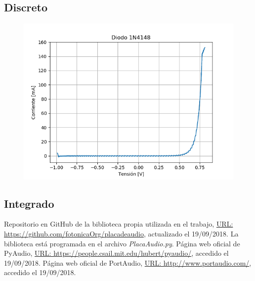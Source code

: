 \documentclass[a4paper,11pt]{article}
\begin{document}
	\subsection{Discreto}
	\label{sec:discreto}
	
	\begin{figure}[h]
		\centering
		\includegraphics[width=\textwidth]{imagenes/Diodo1N4148.png}
		\caption{}
	\end{figure}
	
	\subsection{Integrado}
	\label{sec:integrado}
	



\begin{thebibliography}{99}

	 Repositorio en GitHub de la biblioteca propia utilizada en el trabajo, \href{https://github.com/fotonicaOrg/placadeaudio}{URL: https://github.com/fotonicaOrg/placadeaudio}, actualizado el 19/09/2018. La biblioteca está programada en el archivo \emph{PlacaAudio.py}.
	 Página web oficial de PyAudio, \href{https://people.csail.mit.edu/hubert/pyaudio/}{URL: https://people.csail.mit.edu/hubert/pyaudio/}, accedido el 19/09/2018.
	 Página web oficial de PortAudio, \href{http://www.portaudio.com/}{URL: http://www.portaudio.com/}, accedido el 19/09/2018.

\end{thebibliography}
\end{document}

